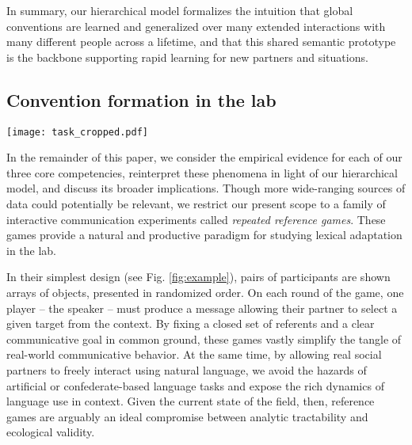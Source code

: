 \documentclass[11pt, floatsintext, jou]{apa6}
\begin{document}
In summary, our hierarchical model formalizes the intuition that global conventions are learned and generalized over many extended interactions with many different people across a lifetime, and that this shared semantic prototype is the backbone supporting rapid learning for new partners and situations. 

\subsection{Convention formation in the lab}

\begin{figure*}[t!]
\centering
\texttt{[image: task\_cropped.pdf]}
\caption{Generic setup for repeated reference game task in the lab using stimuli from Wilkes-Gibbs \& Clark (1986); on every round, the speaker refers to each target in some context, and the listener attempts to pick out the intended referent. Both players are free to speak at any time.}
\label{fig:example}
\end{figure*}

In the remainder of this paper, we consider the empirical evidence for each of our three core competencies, reinterpret these phenomena in light of our hierarchical model, and discuss its broader implications. Though more wide-ranging sources of data could potentially be relevant, we restrict our present scope to a family of interactive communication experiments called \emph{repeated reference games}. These games provide a natural and  productive paradigm for studying lexical adaptation in the lab. 

In their simplest design (see Fig. \ref{fig:example}), pairs of participants are shown arrays of objects, presented in randomized order. On each round of the game, one player -- the speaker -- must produce a message allowing their partner to select a given target from the context. By fixing a closed set of referents and a clear communicative goal in common ground, these games vastly simplify the tangle of real-world communicative behavior. At the same time, by allowing real social partners to freely interact using natural language, we avoid the hazards of artificial or confederate-based language tasks \cite{KuhlenBrennan13_LanguageInDialogue} and expose the rich dynamics of language use in context. Given the current state of the field, then, reference games are arguably an ideal compromise between analytic tractability and ecological validity. 
\end{document}
